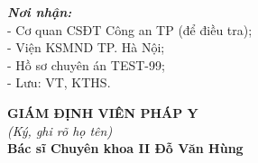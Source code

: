 \documentclass[12pt,a4paper]{article}
\begin{document}
\noindent
\begin{minipage}[t]{0.45\textwidth}
    \small
    \textbf{\textit{Nơi nhận:}}\\
    - Cơ quan CSĐT Công an TP (để điều tra);\\
    - Viện KSMND TP. Hà Nội;\\
    - Hồ sơ chuyên án TEST-99;\\
    - Lưu: VT, KTHS.
\end{minipage}
\hfill
\begin{minipage}[t]{0.5\textwidth}
    \begin{center}
        \small
        \textbf{GIÁM ĐỊNH VIÊN PHÁP Y}\\
        \textit{(Ký, ghi rõ họ tên)}\\[1.5cm]
        \textbf{Bác sĩ Chuyên khoa II Đỗ Văn Hùng}
    \end{center}
\end{minipage}
\end{document}
